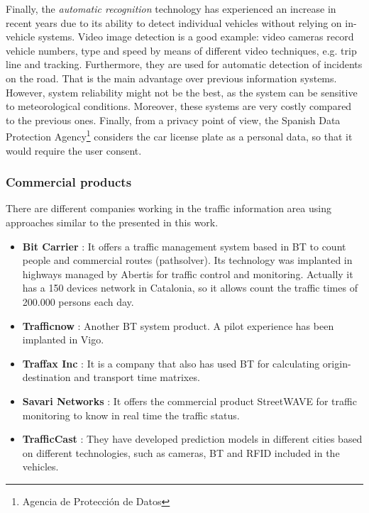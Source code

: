 \documentclass[preprint,authoryear,12pt]{elsarticle}
\begin{document}
Finally, the \emph{automatic recognition} technology has experienced an increase in recent years due to its ability to detect individual vehicles without relying on in-vehicle systems. 
Video image detection is a good example: video cameras record vehicle numbers, type and speed by means of different video techniques, e.g. trip line and tracking. 
Furthermore, they are used for automatic detection of incidents on the road. 
That is the main advantage over previous information systems.
However, system reliability might not be the best, as the system can be sensitive to meteorological conditions.
Moreover, these systems are very costly compared to the previous ones.
Finally, from a privacy point of view, the Spanish Data Protection Agency\footnote{Agencia de Protección de Datos} considers the car license plate as a personal data, so that it would require the user consent.




\subsubsection{Commercial products}
There are different companies working in the traffic information area using approaches similar to the presented in this work.

\begin{itemize}

\item \textbf{Bit Carrier} \cite{patenteBC} \cite{BitCarrier}: It offers a traffic management system based in BT to count people and commercial routes (pathsolver). Its technology was implanted in highways managed by Abertis for traffic control and monitoring. Actually it has a 150 devices network in Catalonia, so it allows count the traffic times of 200.000 persons each day.
 
\item \textbf{Trafficnow} \cite{Trafficnow}: Another BT system product. A pilot experience has been implanted in Vigo.

 \item \textbf{Traffax Inc} \cite{TraffaxInc}: It is a company that also has used BT for calculating origin-destination and transport time matrixes.

 \item \textbf{Savari Networks} \cite{SavariNetworks}: It offers the commercial product StreetWAVE for traffic monitoring to know in real time the traffic status.


 \item \textbf{TrafficCast} \cite{TrafficCast}: They have developed prediction models in different cities based on different technologies, such as cameras, BT and RFID included in the vehicles.

\end{itemize}
\end{document}
